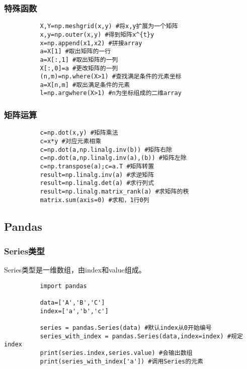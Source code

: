 \documentclass{article}
\begin{document}
      \subsubsection{特殊函数}  
        \begin{lstlisting}
          X,Y=np.meshgrid(x,y) #将x,y扩展为一个矩阵
          x,y=np.outer(x,y) #得到矩阵x^{t}y
          x=np.append(x1,x2) #拼接array
          a=X[1] #取出矩阵的一行
          a=X[:,1] #取出矩阵的一列
          X[:,0]=a #更改矩阵的一列
          (n,m)=np.where(X>1) #查找满足条件的元素坐标
          a=X[n,m] #取出满足条件的元素
          l=np.argwhere(X>1) #n为坐标组成的二维array
        \end{lstlisting}

      \subsubsection{矩阵运算}
        \begin{lstlisting}
          c=np.dot(x,y) #矩阵乘法
          c=x*y #对应元素相乘
          c=np.dot(a,np.linalg.inv(b)) #矩阵右除
          c=np.dot(a,np.linalg.inv(a),(b)) #矩阵左除
          c=np.transpose(a);c=a.T #矩阵转置
          result=np.linalg.inv(a) #求逆矩阵
          result=np.linalg.det(a) #求行列式
          result=np.linalg.matrix_rank(a) #求矩阵的秩
          matrix.sum(axis=0) #求和，1行0列
        \end{lstlisting}

    \subsection{Pandas}
      \subsubsection{Series类型}
        Series类型是一维数组，由index和value组成。
        \begin{lstlisting}
          import pandas

          data=['A','B','C']
          index=['a','b','c']
          
          series = pandas.Series(data) #默认index从0开始编号
          series_with_index = pandas.Series(data,index=index) #规定index
          print(series.index,series.value) #会输出数组
          print(series_with_index['a']) #调用Series的元素
        \end{lstlisting}
\end{document}
